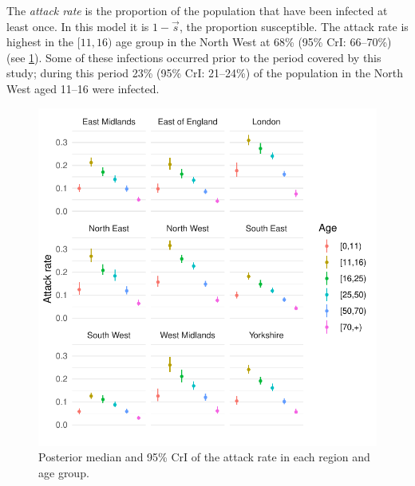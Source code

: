 \documentclass[thesis.tex]{subfiles}
\begin{document}
The \emph{attack rate} is the proportion of the population that have been infected at least once.
In this model it is $1 - \vec{s}$, the proportion susceptible.
The attack rate is highest in the $[11, 16)$ age group in the North West at 68\% (95\% CrI: 66--70\%) (see \cref{SEIR:fig:attack-rates}).
Some of these infections occurred prior to the period covered by this study; during this period 23\% (95\% CrI: 21--24\%) of the population in the North West aged 11--16 were infected.
\begin{figure}
    \includegraphics{SEIR/CIS/attack_rates}
    \caption{Posterior median and 95\% CrI of the attack rate in each region and age group.}
    \label{SEIR:fig:attack-rates}
\end{figure}
\end{document}
